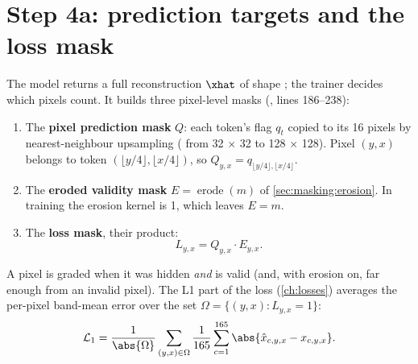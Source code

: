 \section{Step 4a: prediction targets and the loss mask}\label{sec:masking:targets}

The model returns a full reconstruction $\xhat$ of shape ; the trainer decides
which pixels count. It builds three pixel-level masks (,
lines 186--238):

\begin{enumerate}
\item The \textbf{pixel prediction mask} $Q$: each token's flag $q_t$ copied to its 16 pixels by
nearest-neighbour upsampling ( from 32 $\times$ 32 to
128 $\times$ 128). Pixel $(y, x)$ belongs to token $(\lfloor y/4 \rfloor, \lfloor x/4 \rfloor)$, so
$Q_{y,x} = q_{\lfloor y/4 \rfloor, \lfloor x/4 \rfloor}$.
\item The \textbf{eroded validity mask} $E = \operatorname{erode}(m)$ of \cref{sec:masking:erosion}.
In training the erosion kernel is 1, which leaves $E = m$.
\item The \textbf{loss mask}, their product:
\begin{equation}\label{eq:masking:lossmask}
L_{y,x} = Q_{y,x} \cdot E_{y,x} .
\end{equation}
\end{enumerate}
A pixel is graded when it was hidden \emph{and} is valid (and, with erosion on, far enough from an
invalid pixel). The L1 part of the loss (\cref{ch:losses}) averages the per-pixel band-mean error over
the set $\Omega = \{(y,x) : L_{y,x} = 1\}$:
\begin{equation}\label{eq:masking:l1}
\mathcal{L}_{1} = \frac{1}{\abs{\Omega}} \sum_{(y,x) \in \Omega} \frac{1}{165} \sum_{c=1}^{165} \abs{\hat{x}_{c,y,x} - x_{c,y,x}} .
\end{equation}

